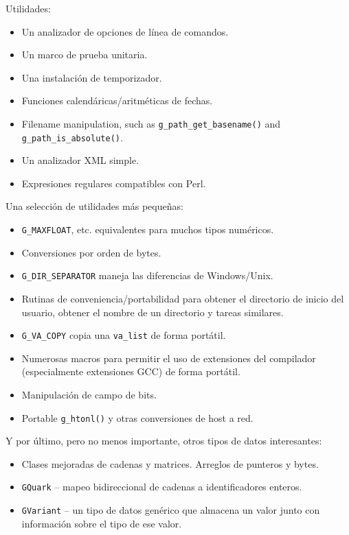 Utilidades:
\begin{itemize}
    \item Un analizador de opciones de línea de comandos.
    \item Un marco de prueba unitaria.
    \item Una instalación de temporizador.
    \item Funciones calendáricas/aritméticas de fechas.
    \item Filename manipulation, such as \lstinline{g_path_get_basename()} and \lstinline{g_path_is_absolute()}.
    \item Un analizador XML simple.
    \item Expresiones regulares compatibles con Perl.
\end{itemize}

Una selección de utilidades más pequeñas:
\begin{itemize}
    \item \lstinline{G_MAXFLOAT}, etc. equivalentes para muchos tipos numéricos.
    \item Conversiones por orden de bytes.
    \item \lstinline{G_DIR_SEPARATOR} maneja las diferencias de Windows/Unix.
    \item Rutinas de conveniencia/portabilidad para obtener el directorio de inicio del usuario, obtener el nombre de un directorio  y tareas similares.
    \item \lstinline{G_VA_COPY} copia una \lstinline{va_list} de forma portátil.
    \item Numerosas macros para permitir el uso de extensiones del compilador (especialmente extensiones GCC) de forma portátil.
    \item Manipulación de campo de bits.
    \item Portable \lstinline {g_htonl()} y otras conversiones de host a red.
\end{itemize}

Y por último, pero no menos importante, otros tipos de datos interesantes:
\begin{itemize}
    \item Clases mejoradas de cadenas y matrices. Arreglos de punteros y bytes.
    \item \lstinline{GQuark} -- mapeo bidireccional de cadenas a identificadores enteros.
    \item \lstinline{GVariant} -- un tipo de datos genérico que almacena un valor junto con información sobre el tipo de ese valor.
\end{itemize}